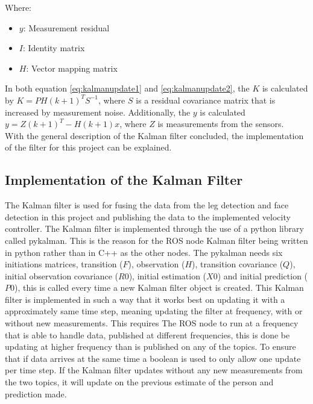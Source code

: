 Where:
\begin{itemize}
    \item $y$: Measurement residual
    \item $I$: Identity matrix 
    \item $H$: Vector mapping matrix
\end{itemize}
\vspace*{5mm}


In both equation \ref{eq:kalmanupdate1} and \ref{eq:kalmanupdate2}, the $K$ is calculated by $K=PH(k+1)^TS^{-1}$, where $S$ is a residual covariance matrix that is increased by measurement noise. Additionally, the $y$ is calculated $y = Z(k+1)^T - H(k+1)x$, where $Z$ is measurements from the sensors.\\

With the general description of the Kalman filter concluded, the implementation of the filter for this project can be explained.

\subsection{Implementation of the Kalman Filter}

The Kalman filter is used for fusing the data from the leg detection and face detection in this project and publishing the data to the implemented velocity controller.
The Kalman filter is implemented through the use of a python library called pykalman\cite{pykalman}. This is the reason for the ROS node Kalman filter being written in python rather than in C++ as the other nodes.
The pykalman needs six initiations matrices, transition ($F$), observation ($H$), transition covariance ($Q$), initial observation covariance ($R0$), initial estimation ($X0$) and initial prediction ($P0$), this is called every time a new Kalman filter object is created. This Kalman filter is implemented in such a way that it works best on updating it with a approximately same time step, meaning updating the filter at frequency, with or without new measurements. This requires The ROS node to run at a frequency that is able to handle data, published at different frequencies, this is done be updating at higher frequency than is published on any of the topics. To ensure that if data arrives at the same time a boolean is used to only allow one update per time step. If the Kalman filter updates without any new measurements from the two topics, it will update on the previous estimate of the person and prediction made.\\

